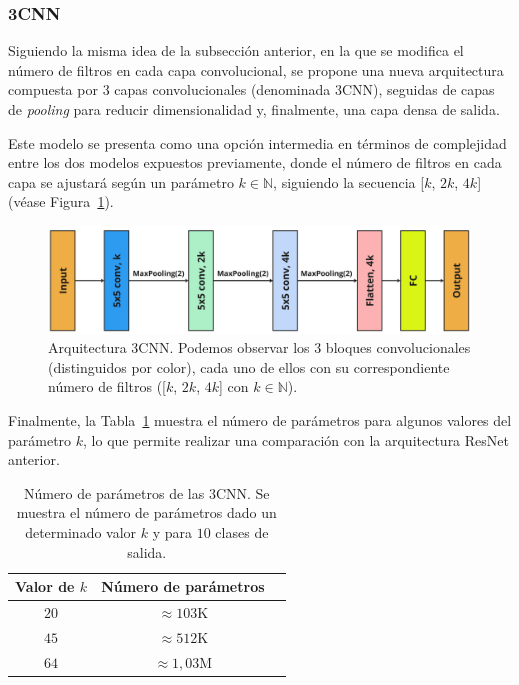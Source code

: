 \subsubsection{3CNN}\label{subsubsec:3CNN}

Siguiendo la misma idea de la subsección anterior, en la que se modifica el número de filtros en cada capa convolucional, se propone una nueva arquitectura compuesta por $3$ capas convolucionales (denominada $3$CNN), seguidas de capas de \textit{pooling} para reducir dimensionalidad y, finalmente, una capa densa de salida.

Este modelo se presenta como una opción intermedia en términos de complejidad entre los dos modelos expuestos previamente, donde el número de filtros en cada capa se ajustará según un parámetro $k \in \mathbb{N}$, siguiendo la secuencia [$k$, $2k$, $4k$] (véase Figura~\ref{fig:3CNN}).

\begin{figure}[h]
    \centering
    \includegraphics[width=0.8\linewidth]{img/experiments/3CNN.png}
    \caption[Arquitectura $3$CNN.]{Arquitectura $3$CNN. Podemos observar los $3$ bloques convolucionales (distinguidos por color), cada uno de ellos con su correspondiente número de filtros ([$k$, $2k$, $4k$] con $k \in \mathbb{N}$).}\label{fig:3CNN}
\end{figure}

Finalmente, la Tabla~\ref{tab:numero-parametros3cnn} muestra el número de parámetros para algunos valores del parámetro $k$, lo que permite realizar una comparación con la arquitectura ResNet anterior.

\begin{table}[ht]
    \centering
    \begin{tabular}{|c|c|c|}
    \hline
    \textbf{Valor de $k$}           & \textbf{Número de parámetros}                     
    \\ \hline
    $20$                  & $\approx 103$\space K                                            \\ \hline
    $45$                  & $\approx 512$\space K                                             \\ \hline
    $64$                  & $\approx 1,03$\space M                                             \\ \hline
    \end{tabular}
    \caption[Número de parámetros de las arquitecturas $3$CNN.]{Número de parámetros de las $3$CNN. Se muestra el número de parámetros dado un determinado valor $k$ y para $10$ clases de salida.}\label{tab:numero-parametros3cnn}
\end{table}

